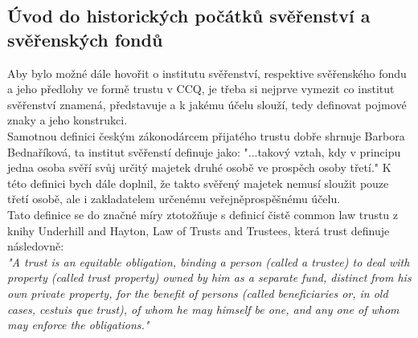 \documentclass{article}
\begin{document}
\newpage

\subsection{Úvod do historických počátků svěřenství a svěřenských fondů}

\indent Aby bylo možné dále hovořit o institutu svěřenství, respektive svěřenského fondu a jeho předlohy ve formě trustu v CCQ, je třeba si nejprve vymezit co institut svěřenství znamená, představuje a k jakému účelu slouží, tedy definovat pojmové znaky a jeho konstrukci.\\

Samotnou definici českým zákonodárcem přijatého trustu dobře shrnuje Bar\-bora Bednaříková, ta institut svěřenstí definuje jako: "...takový vztah, kdy v principu jedna osoba svěří svůj určitý majetek druhé osobě ve prospěch osoby třetí." K této definici bych dále doplnil, že takto svěřený majetek nemusí sloužit pouze třetí osobě, ale i zakladatelem určenému veřejněprospěšnému účelu.\\

Tato definice se do značné míry ztotožňuje s definicí čistě common law trustu z knihy Underhill and Hayton, Law of Trusts and Trustees, která trust definuje následovně:\\ 


\textit{"A trust is an equitable obligation, binding a person (called a trustee) to deal with property (called trust property) owned by him as a separate fund, distinct from his own private property, for the benefit of persons (called beneficiaries or, in old cases, cestuis que trust), of whom he may himself be one, and any one of whom may enforce the obligations."} \\

\end{document}
